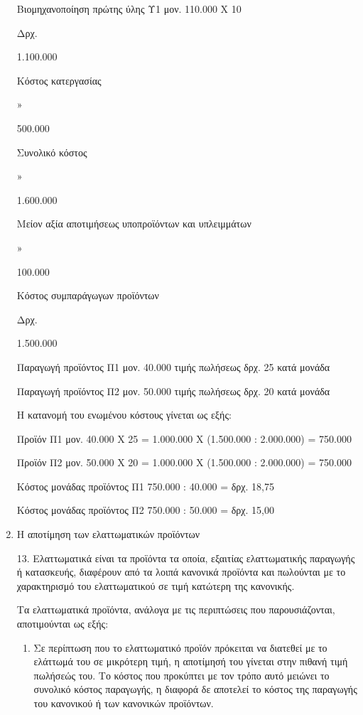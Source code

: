 \documentclass[A4,10pt,greek]{book}
\begin{document}
\begin{enumerate}
Βιομηχανοποίηση πρώτης ύλης Υ1 μον. 110.000 Χ 10
	

Δρχ.
	

1.100.000

Κόστος κατεργασίας
	

»
	

 500.000

Συνολικό κόστος
	

»
	

1.600.000

Μείον αξία αποτιμήσεως υποπροϊόντων και υπλειμμάτων
	

»
	

100.000

Κόστος συμπαράγωγων προϊόντων
	

Δρχ.
	

1.500.000

 

Παραγωγή προϊόντος Π1 μον. 40.000 τιμής πωλήσεως δρχ. 25 κατά μονάδα

Παραγωγή προϊόντος Π2 μον. 50.000 τιμής πωλήσεως δρχ. 20 κατά μονάδα

Η κατανομή του ενωμένου κόστους γίνεται ως εξής:

Προϊόν Π1 μον. 40.000 Χ 25 = 1.000.000 Χ (1.500.000 : 2.000.000) = 750.000

Προϊόν Π2 μον. 50.000 Χ 20 = 1.000.000 Χ (1.500.000 : 2.000.000) = 750.000

Κόστος μονάδας προϊόντος Π1 750.000 : 40.000 = δρχ. 18,75

Κόστος μονάδας προϊόντος Π2 750.000 : 50.000 = δρχ. 15,00

\item Η αποτίμηση των ελαττωματικών προϊόντων

13. Ελαττωματικά είναι τα προϊόντα τα οποία, εξαιτίας ελαττωματικής παραγωγής ή κατασκευής, διαφέρουν από τα λοιπά κανονικά προϊόντα και πωλούνται με το χαρακτηρισμό του ελαττωματικού σε τιμή κατώτερη της κανονικής.

Τα ελαττωματικά προϊόντα, ανάλογα με τις περιπτώσεις που παρουσιάζονται, αποτιμούνται ως εξής:

\begin{enumerate}


\item Σε περίπτωση που το ελαττωματικό προϊόν πρόκειται να διατεθεί με το ελάττωμά του σε μικρότερη τιμή, η αποτίμησή του γίνεται στην πιθανή τιμή πωλήσεώς του. Το κόστος που προκύπτει με τον τρόπο αυτό μειώνει το συνολικό κόστος παραγωγής, η διαφορά δε αποτελεί το κόστος της παραγωγής του κανονικού ή των κανονικών προϊόντων.


\end{enumerate}
\end{enumerate}
\end{document}
